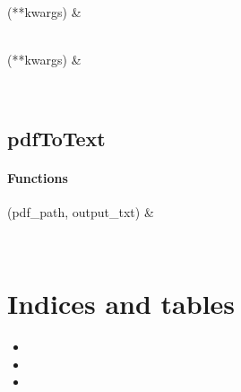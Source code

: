 \documentclass[letterpaper,10pt,english]{sphinxmanual}
\begin{document}
\begin{savenotes}\sphinxattablestart
\sphinxthistablewithglobalstyle
\sphinxthistablewithnovlinesstyle
\centering
\begin{tabulary}{\linewidth}[t]{}
\sphinxtoprule
\sphinxtableatstartofbodyhook
\sphinxAtStartPar
{}(**kwargs)
&
\sphinxAtStartPar

\\
\sphinxhline
\sphinxAtStartPar
{}(**kwargs)
&
\sphinxAtStartPar

\\
\sphinxbottomrule
\end{tabulary}
\sphinxtableafterendhook\par
\sphinxattableend\end{savenotes}

\sphinxstepscope


\section{pdfToText}
\label{\detokenize{generated/pdfToText:module-pdfToText}}\label{\detokenize{generated/pdfToText:pdftotext}}\label{\detokenize{generated/pdfToText::doc}}\subsubsection*{Functions}


\begin{savenotes}\sphinxattablestart
\sphinxthistablewithglobalstyle
\sphinxthistablewithnovlinesstyle
\centering
\begin{tabulary}{\linewidth}[t]{}
\sphinxtoprule
\sphinxtableatstartofbodyhook
\sphinxAtStartPar
{}(pdf\_path, output\_txt)
&
\sphinxAtStartPar

\\
\sphinxbottomrule
\end{tabulary}
\sphinxtableafterendhook\par
\sphinxattableend\end{savenotes}


\chapter{Indices and tables}
\label{\detokenize{index:indices-and-tables}}\begin{itemize}
\item {} 
\sphinxAtStartPar
{}

\item {} 
\sphinxAtStartPar
{}

\item {} 
\sphinxAtStartPar
{}

\end{itemize}
\end{document}
